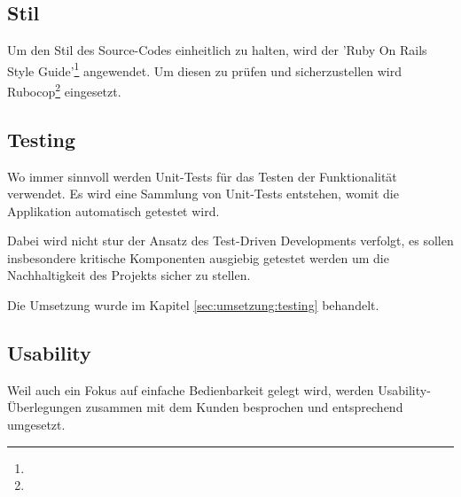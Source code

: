 \subsection*{Stil}

Um den Stil des Source-Codes einheitlich zu halten, wird der 'Ruby On Rails Style Guide'\footnote{} angewendet. Um diesen zu prüfen und sicherzustellen wird Rubocop\footnote{} eingesetzt.

\subsection*{Testing}

Wo immer sinnvoll werden Unit-Tests für das Testen der Funktionalität verwendet. Es wird eine Sammlung von Unit-Tests entstehen, womit die Applikation automatisch getestet wird.

Dabei wird nicht stur der Ansatz des Test-Driven Developments verfolgt, es sollen insbesondere kritische Komponenten ausgiebig getestet werden um die Nachhaltigkeit des Projekts sicher zu stellen.

Die Umsetzung wurde im Kapitel \ref{sec:umsetzung:testing} behandelt.

\subsection*{Usability}

Weil auch ein Fokus auf einfache Bedienbarkeit gelegt wird, werden Usability-Überlegungen zusammen mit dem Kunden besprochen und entsprechend umgesetzt.

\xxx